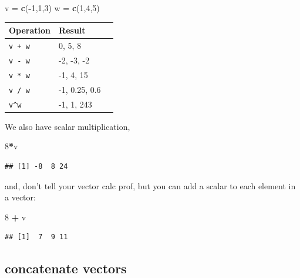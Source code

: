 \documentclass[
]{book}
\newenvironment{Shaded}{\begin{snugshade}}{\end{snugshade}}
\newcommand{\DecValTok}[1]{\textcolor[rgb]{0.00,0.00,0.81}{#1}}
\newcommand{\FunctionTok}[1]{\textcolor[rgb]{0.13,0.29,0.53}{\textbf{#1}}}
\newcommand{\NormalTok}[1]{#1}
\newcommand{\OtherTok}[1]{\textcolor[rgb]{0.56,0.35,0.01}{#1}}
\newcommand{\SpecialCharTok}[1]{\textcolor[rgb]{0.81,0.36,0.00}{\textbf{#1}}}
\theoremstyle{definition}
\theoremstyle{definition}
\theoremstyle{definition}
\theoremstyle{definition}
\theoremstyle{remark}
\begin{document}
\begin{Shaded}
\begin{Highlighting}[]
\NormalTok{v }\OtherTok{=} \FunctionTok{c}\NormalTok{(}\SpecialCharTok{{-}}\DecValTok{1}\NormalTok{,}\DecValTok{1}\NormalTok{,}\DecValTok{3}\NormalTok{)}
\NormalTok{w }\OtherTok{=} \FunctionTok{c}\NormalTok{(}\DecValTok{1}\NormalTok{,}\DecValTok{4}\NormalTok{,}\DecValTok{5}\NormalTok{)}
\end{Highlighting}
\end{Shaded}

\begin{longtable}[]{@{}lll@{}}
\toprule\noalign{}
Operation & Result & \\
\midrule\noalign{}
\endhead
\bottomrule\noalign{}
\endlastfoot
\texttt{v\ +\ w} & 0, 5, 8 & \\
\texttt{v\ -\ w} & -2, -3, -2 & \\
\texttt{v\ *\ w} & -1, 4, 15 & \\
\texttt{v\ /\ w} & -1, 0.25, 0.6 & \\
\texttt{v\^{}w} & -1, 1, 243 & \\
\end{longtable}

We also have scalar multiplication,

\begin{Shaded}
\begin{Highlighting}[]
\DecValTok{8}\SpecialCharTok{*}\NormalTok{v}
\end{Highlighting}
\end{Shaded}

\begin{verbatim}
## [1] -8  8 24
\end{verbatim}

and, don't tell your vector calc prof, but you can add a scalar to each element in a vector:

\begin{Shaded}
\begin{Highlighting}[]
\DecValTok{8} \SpecialCharTok{+}\NormalTok{ v}
\end{Highlighting}
\end{Shaded}

\begin{verbatim}
## [1]  7  9 11
\end{verbatim}

\subsection*{concatenate vectors}\label{concatenate-vectors}
\end{document}
